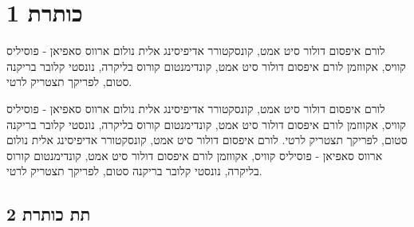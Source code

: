 \documentclass[
  a4paper,
]{article}
\author{}
\date{}
\begin{document}
\NewCoffin\Output   %
\NewCoffin\Callout %
\NewCoffin\BackFrame %
\NewCoffin\SideRule  %


\newcommand{\SetCallout}[2]{%
    \SetHorizontalCoffin\Output{} %
    \SetVerticalCoffin\Callout{\linewidth-20pt}{\textbf{#1} \\ #2 \leavevmode \\ \\}

    \SetHorizontalCoffin\BackFrame{
      \begingroup
      \color{green!30!gray!15}\rule{\linewidth}{\CoffinTotalHeight\Callout}
      \endgroup
    }    
    \SetHorizontalCoffin\SideRule{
      \begingroup  
      \color{green!50!black}\rule{3pt}{\CoffinTotalHeight\Callout}
      \endgroup
    } %

    \JoinCoffins*\Output[l,t]\Callout[l,t](10pt,-\baselineskip) %
    \JoinCoffins*\Output[l,t]\SideRule[l,t] %
    \JoinCoffins*\Output[l,t]\BackFrame[l,t] %
    \noindent\TypesetCoffin\Output %
    \vspace*{\CoffinTotalHeight\Callout}\bigskip %
}

\section{כותרת 1}\label{ux5dbux5d5ux5eaux5e8ux5ea-1}

לורם איפסום דולור סיט אמט, קונסקטורר אדיפיסינג אלית נולום ארווס סאפיאן -
פוסיליס קוויס, אקווזמן לורם איפסום דולור סיט אמט, קונדימנטום קורוס
בליקרה, נונסטי קלובר בריקנה סטום, לפריקך תצטריק לרטי.

לורם איפסום דולור סיט אמט, קונסקטורר אדיפיסינג אלית נולום ארווס סאפיאן -
פוסיליס קוויס, אקווזמן לורם איפסום דולור סיט אמט, קונדימנטום קורוס
בליקרה, נונסטי קלובר בריקנה סטום, לפריקך תצטריק לרטי. לורם איפסום דולור
סיט אמט, קונסקטורר אדיפיסינג אלית נולום ארווס סאפיאן - פוסיליס קוויס,
אקווזמן לורם איפסום דולור סיט אמט, קונדימנטום קורוס בליקרה, נונסטי קלובר
בריקנה סטום, לפריקך תצטריק לרטי.

\subsection{תת כותרת 2}\label{ux5eaux5ea-ux5dbux5d5ux5eaux5e8ux5ea-2}
\end{document}
